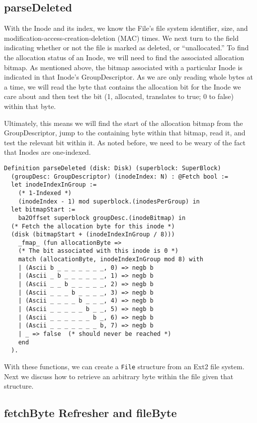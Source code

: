 \documentclass[nocopyrightspace,preprint]{sigplanconf}
\begin{document}
\subsection{parseDeleted}
With the Inode and its index, we know the File's file system identifier, size,
and modification-access-creation-deletion (MAC) times.  We next turn to the
field indicating whether or not the file is marked as deleted, or
``unallocated.'' To find the allocation status of an Inode, we will need to
find the associated allocation bitmap. As mentioned above, the bitmap
associated with a particular Inode is indicated in that Inode's
GroupDescriptor. As we are only reading whole bytes at a time, we will read
the byte that contains the allocation bit for the Inode we care about and then
test the bit (1, allocated, translates to true; 0 to false) within that byte.

Ultimately, this means we will find the start of the allocation bitmap from
the GroupDescriptor, jump to the containing byte within that bitmap, read it,
and test the relevant bit within it. As noted before, we need to be weary of
the fact that Inodes are one-indexed.

\begin{lstlisting}
Definition parseDeleted (disk: Disk) (superblock: SuperBlock)
  (groupDesc: GroupDescriptor) (inodeIndex: N) : @Fetch bool :=
  let inodeIndexInGroup := 
    (* 1-Indexed *)
    (inodeIndex - 1) mod superblock.(inodesPerGroup) in
  let bitmapStart := 
    ba2Offset superblock groupDesc.(inodeBitmap) in
  (* Fetch the allocation byte for this inode *)
  (disk (bitmapStart + (inodeIndexInGroup / 8))) 
    _fmap_ (fun allocationByte =>
    (* The bit associated with this inode is 0 *)
    match (allocationByte, inodeIndexInGroup mod 8) with
    | (Ascii b _ _ _ _ _ _ _, 0) => negb b
    | (Ascii _ b _ _ _ _ _ _, 1) => negb b
    | (Ascii _ _ b _ _ _ _ _, 2) => negb b
    | (Ascii _ _ _ b _ _ _ _, 3) => negb b
    | (Ascii _ _ _ _ b _ _ _, 4) => negb b
    | (Ascii _ _ _ _ _ b _ _, 5) => negb b
    | (Ascii _ _ _ _ _ _ b _, 6) => negb b
    | (Ascii _ _ _ _ _ _ _ b, 7) => negb b
    | _ => false  (* should never be reached *)
    end
  ).
\end{lstlisting}

With these functions, we can create a {\tt File} structure from an Ext2 file
system. Next we discuss how to retrieve an arbitrary byte within the file
given that structure.

\subsection{fetchByte Refresher and fileByte}
\end{document}

